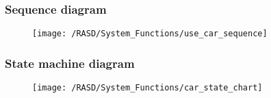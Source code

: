 \newpage
\subsubsection{Sequence diagram}
\begin{figure}[!ht]
  \centering
  \vspace{0.2cm}
  \texttt{[image: /RASD/System\_Functions/use\_car\_sequence]}\\
  \vspace{0.4cm}
  \label{fig:use_car_sequence} 
\end{figure}

\subsubsection{State machine diagram}
\begin{figure}[!ht]
  \centering
  \vspace{0.2cm}
  \texttt{[image: /RASD/System\_Functions/car\_state\_chart]}\\
  \vspace{0.4cm}
  \label{fig:car_state_chart} 
\end{figure}
